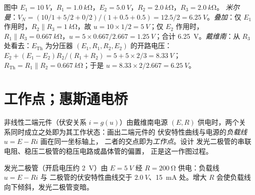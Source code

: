 \begin{example}[同一结果的三种求法]\label{ex:b1:dc-circuits:threeways}
图中 $E_1 = \qty{10}{V}$，$R_1 = \qty{1.0}{k\ohm}$，$E_2 =
\qty{5.0}{V}$，$R_2 = \qty{2.0}{k\ohm}$，$R_3 = \qty{2.0}{k\ohm}$。
\emph{米尔曼}：$V_N = (10/1 + 5/2 + 0/2)/(1 + 0.5 + 0.5) = 12.5/2 =
\qty{6.25}{V}$。\emph{叠加}：仅 $E_1$ 作用时，$R_2 \parallel
R_3 = \qty{1}{k\ohm}$，故 $u = 10 \times 1/2 = \qty{5}{V}$；仅 $E_2$ 作用时，
$R_1 \parallel R_3 = \qty{0.667}{k\ohm}$，$u = 5 \times 0.667/2.667
= \qty{1.25}{V}$；合计 \qty{6.25}{V}。\emph{戴维南}：从
$R_3$ 处看去：$E_{\mathrm{Th}}$ 为分压器
$(E_1, R_1, R_2, E_2)$ 的开路电压：$E_2 + (E_1 - E_2)R_2/(R_1 + R_2) = 5 + 5 \times
2/3 = \qty{8.33}{V}$；$R_{\mathrm{Th}} = R_1 \parallel R_2 =
\qty{0.667}{k\ohm}$；于是 $u = 8.33 \times 2/2.667 = \qty{6.25}{V}$。
\end{example}

\section{工作点；惠斯通电桥}

\begin{method}[图解法求工作点]\label{met:b1:dc-circuits:loadline}
非线性二端元件（伏安关系 $i = g(u)$）由戴维南电源
$(E, R)$ 供电时，两个关系同时成立之处即为其工作状态：画出二端元件的
伏安特性曲线与电源的\emph{负载线} $u = E - Ri$ 画在同一坐标轴上，
二者的交点即为\emph{工作点}。设计
发光二极管的串联电阻、稳压二极管的稳压电路或晶体管的偏置，
正是这一作图过程。
\end{method}

\begin{omfigure}

{\small 发光二极管（开启电压约 \qty{2}{V}）由 $E = \qty{5}{V}$ 经
$R = \qty{200}{\ohm}$ 供电：负载线 $u = E - Ri$ 与
二极管的伏安特性曲线交于 $\qty{2.0}{V}$、\qty{15}{mA} 处。增大 $R$
会使负载线向下倾斜，发光二极管变暗。}
\end{omfigure}

